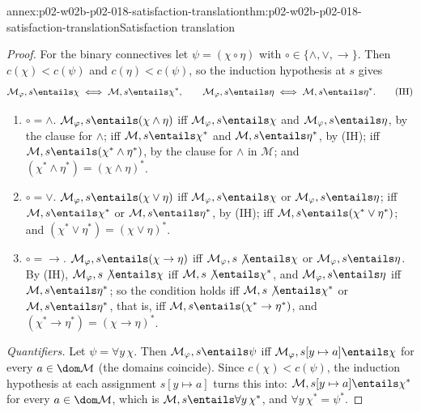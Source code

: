 \begin{annexitem}{annex:p02-w02b-p02-018-satisfaction-translation}{thm:p02-w02b-p02-018-satisfaction-translation}{Satisfaction translation}
\begin{proof}
For the binary connectives let \(\psi=(\chi\circ\eta)\) with
\(\circ\in\{\land,\lor,\to\}\).  Then \(c(\chi)<c(\psi)\) and
\(c(\eta)<c(\psi)\), so the induction hypothesis at \(s\) gives
\begin{equation*}
 \mathcal M_{\varphi},s\entails\chi\iff\mathcal M,s\entails\chi^{*},
 \qquad
 \mathcal M_{\varphi},s\entails\eta\iff\mathcal M,s\entails\eta^{*}.
 \tag{IH}
\end{equation*}
\begin{enumerate}
 \item \(\circ={\land}\).  \(\mathcal M_{\varphi},s\entails(\chi\land\eta)\)
       iff \(\mathcal M_{\varphi},s\entails\chi\) and
       \(\mathcal M_{\varphi},s\entails\eta\), by the clause for \(\land\);
       iff \(\mathcal M,s\entails\chi^{*}\) and
       \(\mathcal M,s\entails\eta^{*}\), by (IH); iff
       \(\mathcal M,s\entails(\chi^{*}\land\eta^{*})\), by the clause for
       \(\land\) in \(\mathcal M\); and
       \((\chi^{*}\land\eta^{*})=(\chi\land\eta)^{*}\).
 \item \(\circ={\lor}\).  \(\mathcal M_{\varphi},s\entails(\chi\lor\eta)\)
       iff \(\mathcal M_{\varphi},s\entails\chi\) or
       \(\mathcal M_{\varphi},s\entails\eta\); iff
       \(\mathcal M,s\entails\chi^{*}\) or \(\mathcal M,s\entails\eta^{*}\), by
       (IH); iff \(\mathcal M,s\entails(\chi^{*}\lor\eta^{*})\); and
       \((\chi^{*}\lor\eta^{*})=(\chi\lor\eta)^{*}\).
 \item \(\circ={\to}\).  \(\mathcal M_{\varphi},s\entails(\chi\to\eta)\)
       iff \(\mathcal M_{\varphi},s\not\entails\chi\) or
       \(\mathcal M_{\varphi},s\entails\eta\).  By (IH),
       \(\mathcal M_{\varphi},s\not\entails\chi\) iff
       \(\mathcal M,s\not\entails\chi^{*}\), and
       \(\mathcal M_{\varphi},s\entails\eta\) iff
       \(\mathcal M,s\entails\eta^{*}\); so the condition holds iff
       \(\mathcal M,s\not\entails\chi^{*}\) or \(\mathcal M,s\entails\eta^{*}\),
       that is, iff \(\mathcal M,s\entails(\chi^{*}\to\eta^{*})\), and
       \((\chi^{*}\to\eta^{*})=(\chi\to\eta)^{*}\).
\end{enumerate}

\emph{Quantifiers.}  Let \(\psi=\forall y\,\chi\).  Then
\(\mathcal M_{\varphi},s\entails\psi\) iff
\(\mathcal M_{\varphi},s[y\mapsto a]\entails\chi\) for every
\(a\in\dom\mathcal M\) (the domains coincide).  Since \(c(\chi)<c(\psi)\),
the induction hypothesis at each assignment \(s[y\mapsto a]\) turns this
into: \(\mathcal M,s[y\mapsto a]\entails\chi^{*}\) for every
\(a\in\dom\mathcal M\), which is \(\mathcal M,s\entails\forall y\,\chi^{*}\),
and \(\forall y\,\chi^{*}=\psi^{*}\).


\end{proof}
\end{annexitem}
